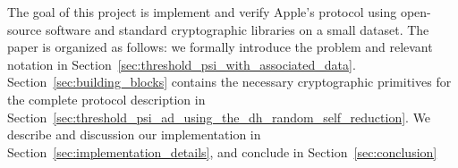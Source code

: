 The goal of this project is implement and verify Apple's protocol using open-source software and standard cryptographic libraries on a small dataset. The paper is organized as follows: we formally introduce the problem and relevant notation in Section~\ref{sec:threshold_psi_with_associated_data}. Section~\ref{sec:building_blocks} contains the necessary cryptographic primitives for the complete protocol description in Section~\ref{sec:threshold_psi_ad_using_the_dh_random_self_reduction}. We describe and discussion our implementation in Section~\ref{sec:implementation_details}, and conclude in Section~\ref{sec:conclusion}


% 	

